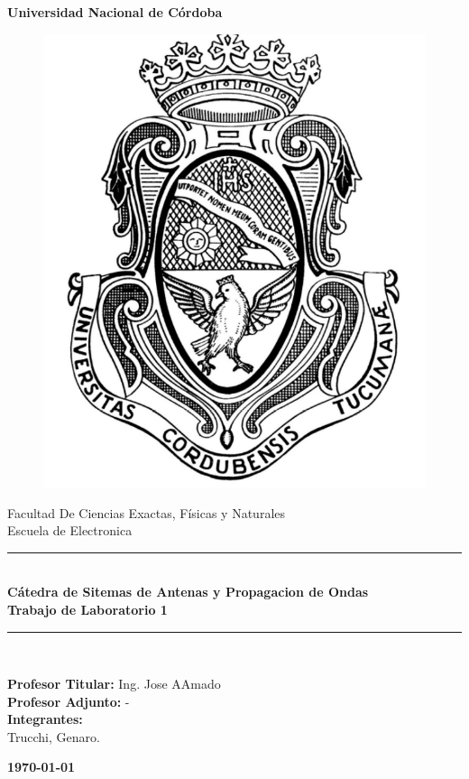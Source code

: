 \begin{titlepage}
	
	\begin{center}
		{\LARGE \textbf{Universidad Nacional de Córdoba}}\\
		\begin{figure}[h]
			\centering
			\includegraphics[scale=0.4]{img/logo2.png}
		\end{figure}
		
		{\large Facultad De Ciencias Exactas, Físicas y Naturales\\Escuela de Electronica}
		
		\rule{\linewidth}{0.3mm}\\
		\vspace{5mm}
		{{\large \textbf{Cátedra de Sitemas de Antenas y Propagacion de Ondas}}}\\
		\vspace{5mm}
		{{\Large \textbf{Trabajo de Laboratorio 1}}}
		\rule{\linewidth}{0.3mm}\\
		
		\vspace{10mm}
		
		{\large {\textbf{Profesor Titular:} Ing. Jose AAmado}\\
        {\textbf{Profesor Adjunto:} -}\\
        \bigskip
		{\textbf{Integrantes:\\} Trucchi, Genaro.}\\
        }
		
		\vspace{15mm}
		
		\textbf{\today}

        \vspace{10mm}

		
	\end{center}
	

\end{titlepage}